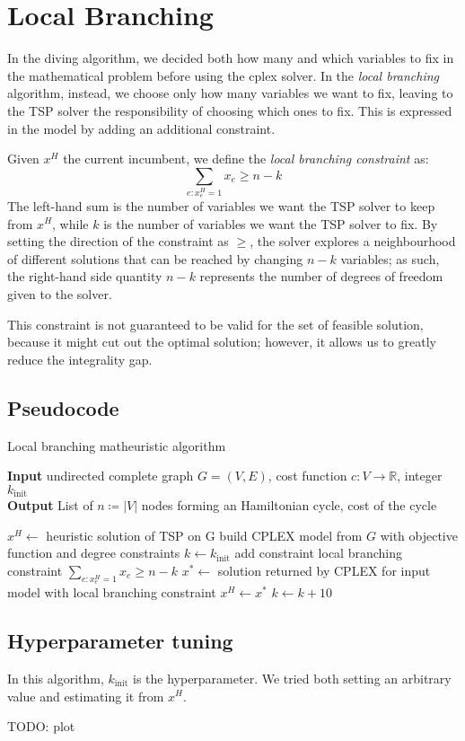 \section{Local Branching}

In the diving algorithm, we decided both how many and which variables to fix in the mathematical problem before using the cplex solver. In the \textit{local branching} algorithm, instead, we choose only how many variables we want to fix, leaving to the TSP solver the responsibility of choosing which ones to fix. This is expressed in the model by adding an additional constraint.

Given $x^H$ the current incumbent, we define the \textit{local branching constraint} as:
$$\sum_{e:x^H_e=1}x_e\geq n-k$$
The left-hand sum is the number of variables we want the TSP solver to keep from $x^H$, while $k$ is the number of variables we want the TSP solver to fix. By setting the direction of the constraint as $\geq$, the solver explores a neighbourhood of different solutions that can be reached by changing $n-k$ variables; as such, the right-hand side quantity $n-k$ represents the number of degrees of freedom given to the solver.

This constraint is not guaranteed to be valid for the set of feasible solution, because it might cut out the optimal solution; however, it allows us to greatly reduce the integrality gap.

\FloatBarrier
\subsection{Pseudocode}
\begin{algorithm}[h]
    \caption{Local branching matheuristic algorithm}
    \hspace*{\algorithmicindent} \textbf{Input} undirected complete graph $G=(V,E)$, cost function $c:V\rightarrow\mathbb{R}$, integer $k_{\text{init}}$\\
    \hspace*{\algorithmicindent} \textbf{Output} List of $n\coloneq|V|$ nodes forming an Hamiltonian cycle, cost of the cycle
    \begin{algorithmic}

        \State $x^H \leftarrow$ heuristic solution of TSP on G
        \State build CPLEX model from $G$ with objective function and degree constraints
        \State $k\leftarrow k_{\text{init}}$
        \State add constraint local branching constraint $\sum_{e:x_e^H=1}x_e\geq n-k$
        \State $x^*\leftarrow$ solution returned by CPLEX for input model with local branching constraint
        \State $x^H\leftarrow x^*$
        \EndIf
        \State $k\leftarrow k+10$
        \EndIf
        \EndWhile

    \end{algorithmic}
\end{algorithm}
\FloatBarrier

\subsection{Hyperparameter tuning}

In this algorithm, $k_{\text{init}}$ is the hyperparameter. We tried both setting an arbitrary value and estimating it from $x^H$.

TODO: plot